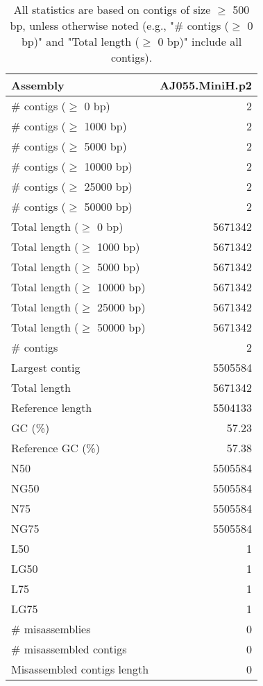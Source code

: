 \documentclass[12pt,a4paper]{article}
\begin{document}
\begin{table}[ht]
\begin{center}
\caption{All statistics are based on contigs of size $\geq$ 500 bp, unless otherwise noted (e.g., "\# contigs ($\geq$ 0 bp)" and "Total length ($\geq$ 0 bp)" include all contigs).}
\begin{tabular}{|l*{1}{|r}|}
\hline
Assembly & AJ055.MiniH.p2 \\ \hline
\# contigs ($\geq$ 0 bp) & 2 \\ \hline
\# contigs ($\geq$ 1000 bp) & 2 \\ \hline
\# contigs ($\geq$ 5000 bp) & 2 \\ \hline
\# contigs ($\geq$ 10000 bp) & 2 \\ \hline
\# contigs ($\geq$ 25000 bp) & 2 \\ \hline
\# contigs ($\geq$ 50000 bp) & 2 \\ \hline
Total length ($\geq$ 0 bp) & 5671342 \\ \hline
Total length ($\geq$ 1000 bp) & 5671342 \\ \hline
Total length ($\geq$ 5000 bp) & 5671342 \\ \hline
Total length ($\geq$ 10000 bp) & 5671342 \\ \hline
Total length ($\geq$ 25000 bp) & 5671342 \\ \hline
Total length ($\geq$ 50000 bp) & 5671342 \\ \hline
\# contigs & 2 \\ \hline
Largest contig & 5505584 \\ \hline
Total length & 5671342 \\ \hline
Reference length & 5504133 \\ \hline
GC (\%) & 57.23 \\ \hline
Reference GC (\%) & 57.38 \\ \hline
N50 & 5505584 \\ \hline
NG50 & 5505584 \\ \hline
N75 & 5505584 \\ \hline
NG75 & 5505584 \\ \hline
L50 & 1 \\ \hline
LG50 & 1 \\ \hline
L75 & 1 \\ \hline
LG75 & 1 \\ \hline
\# misassemblies & 0 \\ \hline
\# misassembled contigs & 0 \\ \hline
Misassembled contigs length & 0 \\ \hline

\end{tabular}
\end{center}
\end{table}
\end{document}
